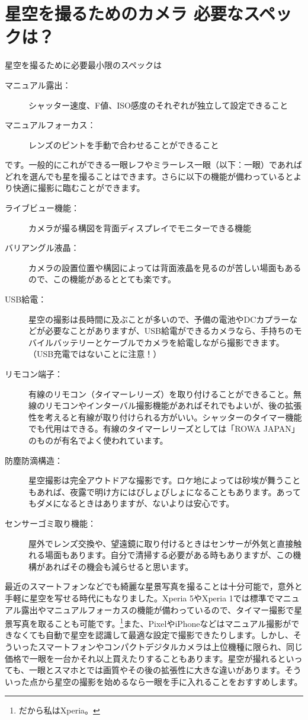 \documentclass[supernova_2023]{subfiles}
\begin{document}
\section{星空を撮るためのカメラ 必要なスペックは？}
星空を撮るために必要最小限のスペックは
\begin{description}
  \item[マニュアル露出：] シャッター速度、F値、ISO感度のそれぞれが独立して設定できること
  \item[マニュアルフォーカス：]レンズのピントを手動で合わせることができること
\end{description}
です。一般的にこれができる一眼レフやミラーレス一眼（以下：一眼）であればどれを選んでも星を撮ることはできます。さらに以下の機能が備わっているとより快適に撮影に臨むことができます。
\begin{description}
  \item[ライブビュー機能：] カメラが撮る構図を背面ディスプレイでモニターできる機能
  \item[バリアングル液晶：] カメラの設置位置や構図によっては背面液晶を見るのが苦しい場面もあるので、この機能があるととても楽です。
  \item[USB給電：] 星空の撮影は長時間に及ぶことが多いので、予備の電池やDCカプラーなどが必要なことがありますが、USB給電ができるカメラなら、手持ちのモバイルバッテリーとケーブルでカメラを給電しながら撮影できます。（USB充電ではないことに注意！）
  \item[リモコン端子：] 有線のリモコン（タイマーレリーズ）を取り付けることができること。無線のリモコンやインターバル撮影機能があればそれでもよいが、後の拡張性を考えると有線が取り付けられる方がいい。シャッターのタイマー機能でも代用はできる。有線のタイマーレリーズとしては「ROWA JAPAN」のものが有名でよく使われています。
  \item[防塵防滴構造：] 星空撮影は完全アウトドアな撮影です。ロケ地によっては砂埃が舞うこともあれば、夜露で明け方にはびしょびしょになることもあります。あってもダメになるときはありますが、ないよりは安心です。
  \item[センサーゴミ取り機能：] 屋外でレンズ交換や、望遠鏡に取り付けるときはセンサーが外気と直接触れる場面もあります。自分で清掃する必要がある時もありますが、この機構があればその機会も減らせると思います。      
\end{description}
\begin{tcolorbox}[title=一眼じゃなきゃダメ？, breakable]
  最近のスマートフォンなどでも綺麗な星景写真を撮ることは十分可能で，意外と手軽に星空を写せる時代にもなりました。Xperia 5やXperia 1では標準でマニュアル露出やマニュアルフォーカスの機能が備わっているので、タイマー撮影で星景写真を取ることも可能です。\footnote{だから私はXperia。}また、PixelやiPhoneなどはマニュアル撮影ができなくても自動で星空を認識して最適な設定で撮影できたりします。しかし、そういったスマートフォンやコンパクトデジタルカメラは上位機種に限られ、同じ価格で一眼を一台かそれ以上買えたりすることもあります。星空が撮れるといっても、一眼とスマホとでは画質やその後の拡張性に大きな違いがあります。そういった点から星空の撮影を始めるなら一眼を手に入れることをおすすめします。
\end{tcolorbox}
\end{document}
